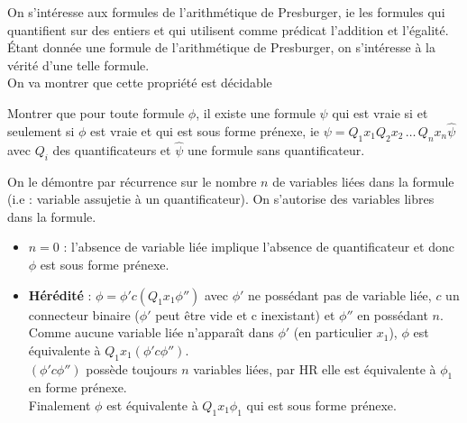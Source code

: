 \documentclass[12pt,letterpaper,boxed]{hmcpset}
\begin{document}
%

\newpage


On s’intéresse aux formules de l’arithmétique de Presburger, ie les formules qui quantifient
sur des entiers et qui utilisent comme prédicat l’addition et l’égalité. Étant donnée
une formule de l’arithmétique de Presburger, on s’intéresse à la vérité d’une telle formule. \\
On va montrer que cette propriété est décidable

\begin{problem} [Question 1]
Montrer que pour toute formule $\phi$, il existe une formule $\psi$ qui est vraie si et seulement
si $\phi$ est vraie et qui est sous forme prénexe, ie $\psi = Q_{1}x_{1}Q_{2}x_{2} \, \dots \, Q_{n}x_{n}\hat{\psi}$ avec $Q_{i}$ des quantificateurs et $\hat{\psi}$ une formule sans quantificateur.
\end{problem}

\begin{solution}

On le démontre par récurrence sur le nombre $n$ de variables liées dans la formule (i.e : variable assujetie à un quantificateur). On s'autorise des variables libres dans la formule.

\begin{itemize}
\item $n = 0$ : l'absence de variable liée implique l'absence de quantificateur et donc $\phi$ est sous forme prénexe.
\item \textbf{Hérédité} : $\phi = \phi' c (Q_{1} x_{1} \phi'')$ avec $\phi'$ ne possédant pas de variable liée, $c$ un connecteur binaire ($\phi'$ peut être vide et c inexistant) et $\phi''$ en possédant $n$. Comme aucune variable liée n'apparaît dans $\phi'$ (en particulier $x_{1}$), $\phi$ est équivalente à $Q_{1} x_{1} (\phi' c \phi'') $. \\
$(\phi' c \phi'')$ possède toujours $n$ variables liées, par HR elle est équivalente à $\phi_{1}$ en forme prénexe. \\
Finalement $\phi$ est équivalente à $Q_{1}x_{1} \phi_{1}$ qui est sous forme prénexe.
\end{itemize}

\end{solution}
\end{document}
